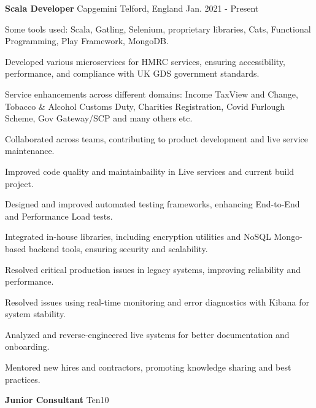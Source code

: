 
\begin{cventries}

  \cventry
    {\textbf{Scala Developer}} %
    {Capgemini} 
    {Telford, England} 
    {Jan. 2021 - Present} 
    {
      \begin{sloppypar}  %
      \begin{cvitems}
        \item {Some tools used: Scala, Gatling, Selenium, proprietary libraries, Cats, Functional Programming, Play Framework, MongoDB.}
        \item {Developed various microservices for HMRC services, ensuring accessibility, performance, and compliance with UK GDS government standards.}
        \item {Service enhancements across different domains: Income TaxView and Change, Tobacco \& Alcohol Customs Duty, Charities Registration, Covid Furlough Scheme, Gov Gateway/SCP and many others etc.}
        \item {Collaborated across teams, contributing to product development and live service maintenance.}
        \item {Improved code quality and maintainbaility in Live services and current build project.}
        \item {Designed and improved automated testing frameworks, enhancing End-to-End and Performance Load tests.}
        \item {Integrated in-house libraries, including encryption utilities and NoSQL Mongo-based backend tools, ensuring security and scalability.}
        \item {Resolved critical production issues in legacy systems, improving reliability and performance.}
        \item {Resolved issues using real-time monitoring and error diagnostics with Kibana for system stability.}
        \item {Analyzed and reverse-engineered live systems for better documentation and onboarding.}
        \item {Mentored new hires and contractors, promoting knowledge sharing and best practices.}
      \end{cvitems}
      \end{sloppypar}
    }
    \cventry
    {\textbf{Junior Consultant}} 
    {Ten10} 

\end{cventries}
